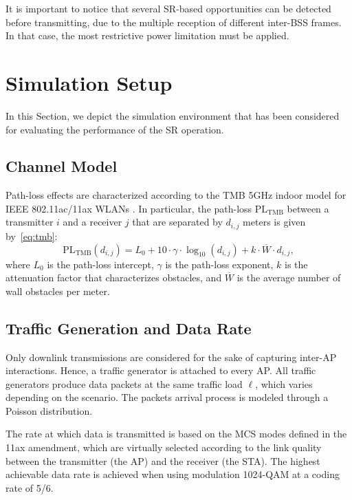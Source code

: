 \documentclass[conference]{IEEEtran}
\begin{document}
	It is important to notice that several SR-based opportunities can be detected before transmitting, due to the multiple reception of different inter-BSS frames. In that case, the most restrictive power limitation must be applied. 
	
	\section{Simulation Setup}
	\label{section:simulation_setup}
	
	In this Section, we depict the simulation environment that has been considered for evaluating the performance of the SR operation.
	
	\subsection{Channel Model}
	
	Path-loss effects are characterized according to the TMB 5GHz indoor model for IEEE 802.11ac/11ax WLANs \cite{tmb}. In particular, the path-loss $\text{PL}_\text{TMB}$ between a transmitter $i$ and a receiver $j$ that are separated by $d_{i,j}$ meters is given by~\eqref{eq:tmb}:
	\begin{equation}
	\text{PL}_\text{TMB}(d_{i,j}) = L_0 + 10 \cdot \gamma \cdot \log_{10}(d_{i,j}) + k \cdot \overline{W} \cdot d_{i,j},
	\label{eq:tmb}
	\end{equation} 
	where  $L_0$ is the path-loss
    intercept, $\gamma$ is the path-loss exponent, $k$ is the attenuation factor that characterizes obstacles, and $\overline{W}$ is the average number of wall obstacles per meter.
	
	\subsection{Traffic Generation and Data Rate}
	Only downlink transmissions are considered for the sake of capturing inter-AP interactions. Hence, a traffic generator is attached to every AP. All traffic generators produce data packets at the same traffic load $\ell$, which varies depending on the scenario. The packets arrival process is modeled through a Poisson distribution.
	
	The rate at which data is transmitted is based on the MCS modes defined in the 11ax amendment, which are virtually selected according to the link quality between the transmitter (the AP) and the receiver (the STA). The highest achievable data rate is achieved when using modulation 1024-QAM at a coding rate of 5/6.
	
\end{document}
